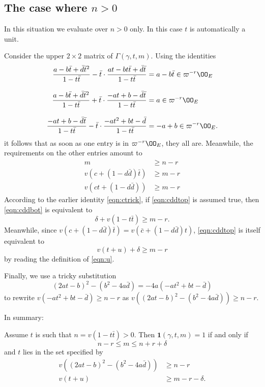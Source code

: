 \subsection{The case where $n > 0$}
In this situation we evaluate over $n > 0$ only.
In this case $t$ is automatically a unit.

Consider the upper $2 \times 2$ matrix of $\Gamma(\gamma, t, m)$.
Using the identities
\begin{align*}
  \dfrac{a-b\bar t+\bar d \bar t^2}{1-t \bar t}
    - \bar t \cdot \dfrac{at-bt\bar t+\bar d \bar t}{1-t \bar t}
    &= a-b\bar t \in \varpi^{-r} \OO_E \\[2ex]
  \dfrac{a-b\bar t+\bar d \bar t^2}{1-t \bar t}
    + \bar t \cdot \dfrac{-at+b-\bar d \bar t}{1-t \bar t}
    &= a \in \varpi^{-r} \OO_E \\[2ex]
  \dfrac{-at+b-\bar d \bar t}{1-t \bar t}
    - \bar t \cdot \dfrac{-at^2+bt-\bar d}{1-t \bar t}
    &= -a+b \in \varpi^{-r} \OO_E.
\end{align*}
it follows that as soon as one entry is in $\varpi^{-r} \OO_E$, they all are.
Meanwhile, the requirements on the other entries amount to
\begin{align}
  m & \geq n - r \\
  v\left( c+(1-d \bar d) \bar t \right) &\geq m-r \label{eqn:cddtop} \\
  v\left( ct+(1-d \bar d) \right) &\geq m-r \label{eqn:cddbot}
\end{align}
According to the earlier identity \eqref{eqn:ctrick},
if \eqref{eqn:cddtop} is assumed true,
then \eqref{eqn:cddbot} is equivalent to
\[ \delta + v(1-t \bar t) \ge m-r. \]
Meanwhile, since $v(c+(1-d \bar d) \bar t) = v(\bar c + (1-d \bar d)t)$,
\eqref{eqn:cddtop} is itself equivalent to
\[ v(t+u) + \delta \geq m-r \]
by reading the definition of \eqref{eqn:u}.

Finally, we use a tricky substitution
\[ (2at-b)^2 - (b^2-4a\bar d) = -4a(-at^2+bt-\bar d) \]
to rewrite $v(-at^2+bt-\bar d) \geq n-r$
as $v\left( (2at-b)^2 - (b^2-4a\bar d) \right) \geq n-r$.

In summary:
\begin{claim}
  Assume $t$ is such that $n = v(1-t \bar t) > 0$.
  Then $\mathbf{1}(\gamma, t, m) = 1$ if and only if
  \[ n - r \leq m \leq n + r + \delta \]
  and $t$ lies in the set specified by
  \begin{align*}
    v\left( (2at-b)^2 - (b^2-4a\bar d) \right) &\geq n-r \\
    v(t+u) &\ge m-r-\delta.
  \end{align*}
\end{claim}
